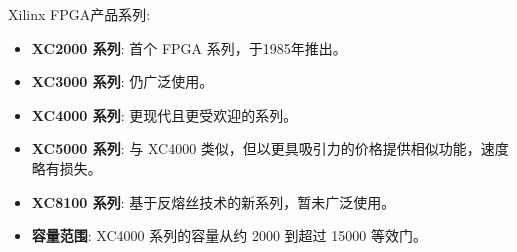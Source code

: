 \begin{frame}{Xilinx FPGA产品系列}:
\begin{itemize}
\item
    \textbf{XC2000 系列}: 首个 FPGA 系列，于1985年推出。
\item
    \textbf{XC3000 系列}: 仍广泛使用。
\item
    \textbf{XC4000 系列}: 更现代且更受欢迎的系列。
\item
    \textbf{XC5000 系列}: 与 XC4000
    类似，但以更具吸引力的价格提供相似功能，速度略有损失。
\item
    \textbf{XC8100 系列}: 基于反熔丝技术的新系列，暂未广泛使用。
\item
    \textbf{容量范围}: XC4000 系列的容量从约 2000 到超过 15000 等效门。
\end{itemize}
\end{frame}


